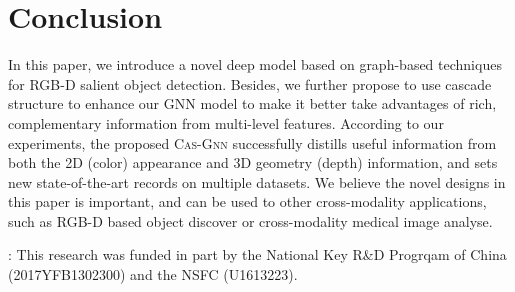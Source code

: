 \documentclass[runningheads]{llncs}
\begin{document}
\section{Conclusion} 
In this paper, we introduce a novel deep model based on graph-based techniques for RGB-D salient object detection. Besides, we further propose to use cascade structure to enhance our GNN model to make it better take advantages of rich, complementary information from multi-level features. According to our experiments, the proposed {\scshape{Cas-Gnn}} successfully distills useful information from both the 2D (color) appearance and 3D geometry (depth) information, and sets new state-of-the-art records on multiple datasets. We believe the novel designs in this paper is important, and can be used to other cross-modality applications, such as RGB-D based object discover or cross-modality medical image analyse. 

: This research was funded in part by	the National Key R\&D Progrqam of China (2017YFB1302300) and the NSFC (U1613223). 


\clearpage


\end{document}
